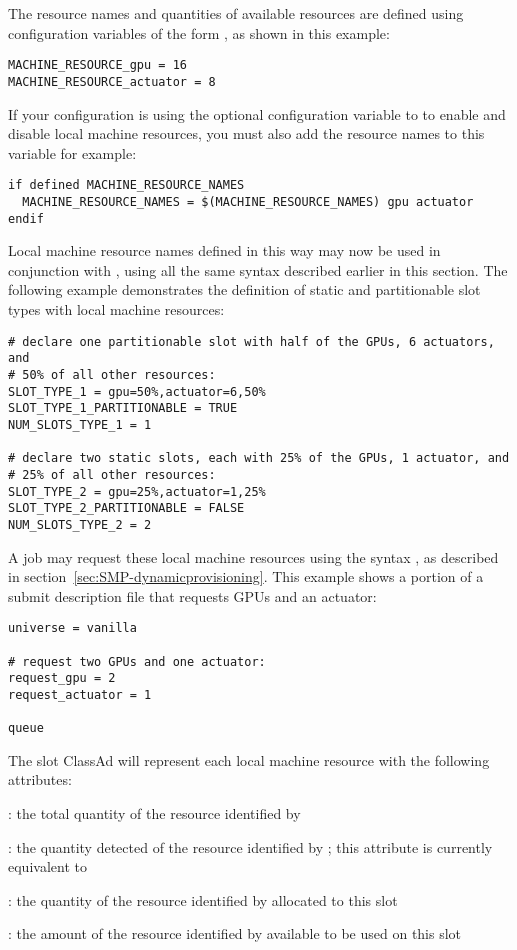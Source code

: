 \begin{description}
The resource names and quantities of available resources are defined using configuration
variables of the form , as shown in this example:
\begin{verbatim}
MACHINE_RESOURCE_gpu = 16
MACHINE_RESOURCE_actuator = 8
\end{verbatim}

If your configuration is using the optional configuration variable 
 to to enable and disable local machine
resources, you must also add the resource names to this variable
for example:
\begin{verbatim}
if defined MACHINE_RESOURCE_NAMES
  MACHINE_RESOURCE_NAMES = $(MACHINE_RESOURCE_NAMES) gpu actuator
endif
\end{verbatim}


Local machine resource names defined in this way may now be used in conjunction 
with , using all the same syntax described
earlier in this section.
The following example demonstrates
the definition of static and partitionable slot types with local machine 
resources:
\begin{verbatim}
# declare one partitionable slot with half of the GPUs, 6 actuators, and
# 50% of all other resources:
SLOT_TYPE_1 = gpu=50%,actuator=6,50%
SLOT_TYPE_1_PARTITIONABLE = TRUE
NUM_SLOTS_TYPE_1 = 1

# declare two static slots, each with 25% of the GPUs, 1 actuator, and
# 25% of all other resources: 
SLOT_TYPE_2 = gpu=25%,actuator=1,25%
SLOT_TYPE_2_PARTITIONABLE = FALSE
NUM_SLOTS_TYPE_2 = 2
\end{verbatim}

A job may request these local machine resources using the 
syntax , 
as described in section~\ref{sec:SMP-dynamicprovisioning}.  
This example shows a portion of a submit description file 
that requests GPUs and an actuator:
\begin{verbatim}
universe = vanilla

# request two GPUs and one actuator:
request_gpu = 2
request_actuator = 1

queue
\end{verbatim}

The slot ClassAd will represent each local machine resource
with the following attributes:
\begin{description}
\item{: the total quantity of the resource 
  identified by }
\item{: the quantity detected of the resource
  identified by ; this attribute is
  currently equivalent to }
\item{: the quantity of the resource
  identified by  allocated to this slot}
\item{: the amount of the resource
  identified by  available to be used on this slot}
\end{description}


\end{description}
